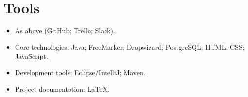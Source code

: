 \documentclass[a4paper, 12pt, titlepage]{article}
\begin{document}
    \section{Tools}
    \begin{itemize}
        \item As above (GitHub; Trello; Slack).
        \item Core technologies: Java; FreeMarker; Dropwizard; PostgreSQL; HTML: CSS; JavaScript.
        \item Development tools: Eclipse/IntelliJ; Maven.
        \item Project documentation: LaTeX.
    \end{itemize}
\end{document}
